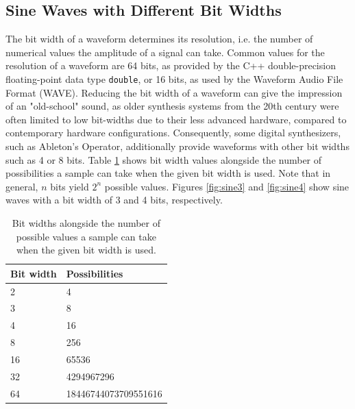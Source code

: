 
  \subsection{Sine Waves with Different Bit Widths}

  The bit width of a waveform determines its resolution, i.e. the number of numerical values the amplitude of a signal can take. Common values for the resolution of a waveform are 64 bits, as provided by the C++ double-precision floating-point data type \texttt{double}, or 16 bits, as used by the Waveform Audio File Format (WAVE). Reducing the bit width of a waveform can give the impression of an "old-school" sound, as older synthesis systems from the 20th century were often limited to low bit-widths due to their less advanced hardware, compared to contemporary hardware configurations. Consequently, some digital synthesizers, such as Ableton's Operator, additionally provide waveforms with other bit widths such as 4 or 8 bits. Table \ref{tb:bitw} shows bit width values alongside the number of possibilities a sample can take when the given bit width is used. Note that in general, $n$ bits yield $2^n$ possible values. Figures \ref{fig:sine3} and \ref{fig:sine4} show sine waves with a bit width of 3 and 4 bits, respectively.

  \begin{table}[th!]

    \centering

    \begin{tabular}[]{| l | l |}
      \hline
      \rowcolor[gray]{0.8}
      Bit width & Possibilities\\\hline
      2 & 4\\\hline
      3 & 8\\\hline
      4 & 16\\\hline
      8 & 256\\\hline
      16 & 65536\\\hline
      32 & 4294967296\\\hline
      64 & 18446744073709551616\\
      \hline
    \end{tabular}

    \caption{Bit widths alongside the number of possible values a sample can take when the given bit width is used.}

    \label{tb:bitw}

  \end{table}

